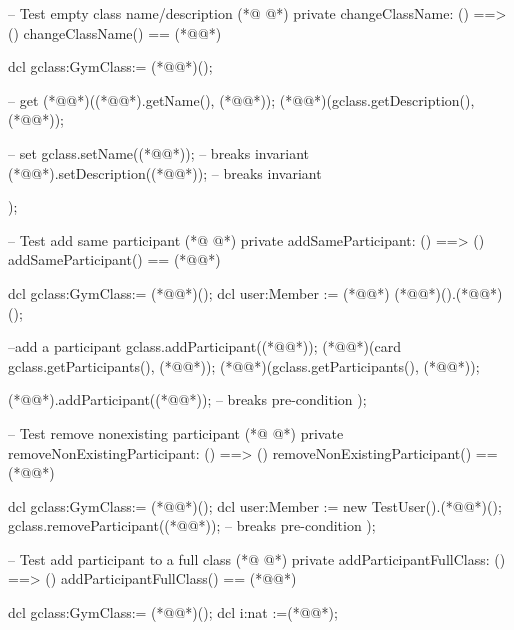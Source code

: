 \begin{vdmpp}[breaklines=true]
 -- Test empty class name/description
(*@
\label{changeClassName:62}
@*)
 private changeClassName: () ==> ()
 changeClassName() == (*@\vdmnotcovered{(}@*)
    
    dcl gclass:GymClass:= (*@@*)();

     -- get
    (*@@*)((*@@*).getName(), (*@@*));
    (*@@*)(gclass.getDescription(), (*@@*));
    
    -- set
    gclass.setName((*@@*));     -- breaks invariant
    (*@@*).setDescription((*@@*)); -- breaks invariant
    
 );
 
 -- Test add same participant
(*@
\label{addSameParticipant:78}
@*)
  private addSameParticipant: () ==> ()
 addSameParticipant() == (*@\vdmnotcovered{(}@*)
    
    dcl gclass:GymClass:= (*@@*)();
     dcl user:Member := (*@@*) (*@@*)().(*@@*)();

     --add a participant
    gclass.addParticipant((*@@*));
    (*@@*)(card gclass.getParticipants(), (*@@*));  
     (*@@*)(gclass.getParticipants(), {(*@@*)});
   
    (*@@*).addParticipant((*@@*));    -- breaks pre-condition
 );
 
 -- Test remove nonexisting participant
(*@
\label{removeNonExistingParticipant:93}
@*)
  private removeNonExistingParticipant: () ==> ()
 removeNonExistingParticipant() == (*@\vdmnotcovered{(}@*)
    
    dcl gclass:GymClass:= (*@@*)();
     dcl user:Member := new TestUser().(*@@*)();
    gclass.removeParticipant((*@@*));   -- breaks pre-condition
 );
 
 
 -- Test add participant to a full class
(*@
\label{addParticipantFullClass:103}
@*)
  private addParticipantFullClass: () ==> ()
 addParticipantFullClass() == (*@\vdmnotcovered{(}@*)
    
   dcl gclass:GymClass:= (*@@*)();
    dcl i:nat :=(*@@*);
    

\end{vdmpp}
